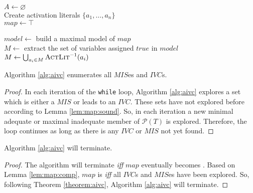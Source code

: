 \begin{algorithm}[t]
  $A \leftarrow \varnothing$\\
  Create activation literals $\{a_1, \ldots, a_n\}$ \\
  $map \leftarrow \top$ \\
  \BlankLine

   {
    $model \leftarrow $ build a maximal model of $map$ \\
    $M \leftarrow$ extract the set of variables assigned $true$ in $model$ \\
    $M \leftarrow \bigcup_{a_i \in M} \textsc{ActLit} ^{-1}(a_i)$ \\
\BlankLine
  }
\caption{$\aivcalg (T, P)$}
\label{alg:aivc}
\end{algorithm}

\begin{theorem}
\label{theorem:aivc}
  Algorithm \ref{alg:aivc} enumerates all $MIS$es and $IVC$s.
\end{theorem}
\begin{proof}
In each iteration of the \texttt{while} loop, Algorithm \ref{alg:aivc} explores a set which is either a $MIS$ or leads to an $IVC$. These sets have not explored before according to Lemma \ref{lem:map:sound}. So, in each iteration a new minimal adequate or maximal inadequate member of $\mathcal {P}(T)$ is explored. Therefore, the loop continues as long as there is any $IVC$ or
$MIS$ not yet found.
\end{proof}


\begin{theorem}
  Algorithm \ref{alg:aivc} will terminate.
\end{theorem}
\begin{proof}
The algorithm will terminate \emph{iff} $map$ eventually becomes  \unsat.
Based on Lemma \ref{lem:map:comp}, $map$ is \unsat \emph{iff} all
$IVC$s and $MIS$es have been explored.
So, following Theorem \ref{theorem:aivc},  Algorithm \ref{alg:aivc} will terminate.
\end{proof}



